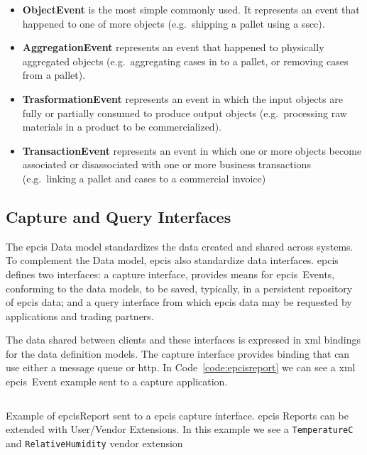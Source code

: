 \begin{itemize}
    \item \textbf{ObjectEvent} is the most simple commonly used. It represents an event that happened to one of more objects (e.g.\ shipping a pallet using a \ac{sscc}).
    \item \textbf{AggregationEvent} represents an event that happened to physically aggregated objects (e.g.\ aggregating cases in to a pallet, or removing cases from a pallet).
    \item \textbf{TrasformationEvent} represents an event in which the input objects are fully or partially consumed to produce output objects (e.g.\ processing raw materials in a product to be commercialized).
    \item \textbf{TransactionEvent} represents an event in which one or more objects become associated or disassociated with one or more business transactions (e.g.\ linking a pallet and cases to a commercial invoice)
\end{itemize}

\subsection{Capture and Query Interfaces}

The \ac{epcis} Data model standardizes the data created and shared across systems. 
To complement the Data model, \ac{epcis} also standardize data interfaces.
\ac{epcis} defines two interfaces: a capture interface, provides means for \ac{epcis}~Events, conforming to the data models, to be saved, typically, in a persistent repository of \ac{epcis} data; and a query interface from which \ac{epcis} data may be requested by applications and trading partners.

The data shared between clients and these interfaces is expressed in \ac{xml} bindings for the data definition models.
The capture interface provides binding that can use either a message queue or \ac{http}. In Code~\ref{code:epcisreport} we can see a \ac{xml} \ac{epcis}~Event example sent to a capture application. 

\begin{listing}
    \inputminted[linenos, breaklines]{xml}{./code/sota/EPCIS_query_response.xml}
    \caption{Example of \ac{epcis}Report sent to a \ac{epcis} capture interface. \ac{epcis} Reports can be extended with User/Vendor Extensions. In this example we see a \texttt{TemperatureC} and \texttt{RelativeHumidity} vendor extension}
    \label{code:epcisreport}
\end{listing}

